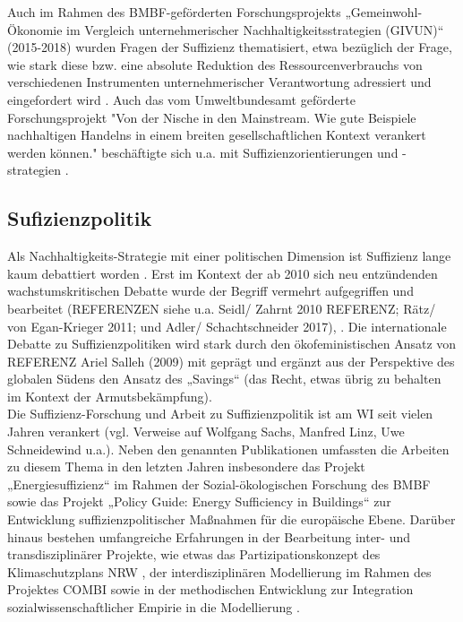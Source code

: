 \documentclass[a4paper,11pt,twoside]{scrartcl}
\begin{document}
Auch im Rahmen des BMBF-geförderten Forschungsprojekts „Gemeinwohl-Ökonomie im Vergleich unternehmerischer Nachhaltigkeitsstrategien (GIVUN)“ (2015-2018) wurden Fragen der Suffizienz thematisiert, etwa bezüglich der Frage, wie stark diese bzw. eine absolute Reduktion des Ressourcenverbrauchs von verschiedenen Instrumenten unternehmerischer Verantwortung adressiert und eingefordert wird \cite{Sommer2016b}.
Auch das vom Umweltbundesamt geförderte Forschungsprojekt "Von der Nische in den Mainstream. Wie gute Beispiele nachhaltigen Handelns in einem breiten gesellschaftlichen Kontext verankert werden können." beschäftigte sich u.a. mit Suffizienzorientierungen und -strategien \cite{Kny2015}.
    
\subsection*{Sufizienzpolitik}

Als Nachhaltigkeits-Strategie mit einer politischen Dimension ist Suffizienz lange kaum debattiert worden \cite{Winterfeld2002}. Erst im Kontext der ab 2010 sich neu entzündenden wachstumskritischen Debatte wurde der Begriff vermehrt aufgegriffen und bearbeitet (REFERENZEN siehe u.a. Seidl/ Zahrnt 2010 REFERENZ; Rätz/ von Egan-Krieger 2011; und Adler/ Schachtschneider 2017), \cite{Schneidewind2013,Winterfeld2017,Linz2015,Bierwirth2015,Thomas2015}. Die internationale Debatte zu Suffizienzpolitiken wird stark durch den ökofeministischen Ansatz von REFERENZ Ariel Salleh (2009) mit geprägt und ergänzt aus der Perspektive des globalen Südens den Ansatz des „Savings“ (das Recht, etwas übrig zu behalten im Kontext der Armutsbekämpfung).\\
Die Suffizienz-Forschung und Arbeit zu Suffizienzpolitik ist am WI seit vielen Jahren verankert (vgl. Verweise auf Wolfgang Sachs, Manfred Linz, Uwe Schneidewind u.a.).
Neben den genannten Publikationen umfassten die Arbeiten zu diesem Thema in den letzten Jahren insbesondere das Projekt „Energiesuffizienz“ \cite{Brischke2016} im Rahmen der Sozial-ökologischen Forschung des BMBF sowie das Projekt „Policy Guide: Energy Sufficiency in Buildings“ \cite{EnergySufficiencyProjekt} zur Entwicklung suffizienzpolitischer Maßnahmen für die europäische Ebene.
Darüber hinaus bestehen umfangreiche Erfahrungen in der Bearbeitung inter- und transdisziplinärer Projekte, wie etwas das Partizipationskonzept des Klimaschutzplans NRW \cite{Klimaschutzplan2011,Klimaschutzplan2012}, der interdisziplinären Modellierung im Rahmen des Projektes COMBI \cite{COMBI2015} sowie in der methodischen Entwicklung zur Integration sozialwissenschaftlicher Empirie in die Modellierung \cite{Bierwirth2016}.
\end{document}
